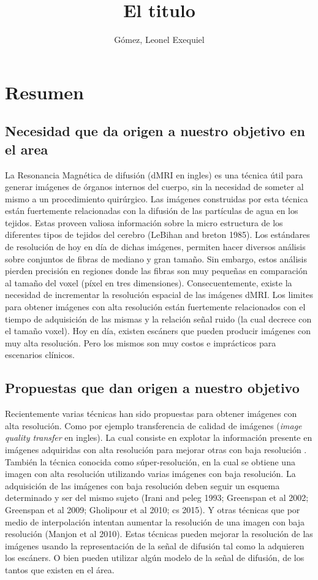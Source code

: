 \documentclass[a4paper,10pt]{article}
\title{El titulo}
\author{Gómez, Leonel Exequiel}
\begin{document}
\maketitle

\section{Resumen}

\subsection{Necesidad que da origen a nuestro objetivo en el area}
La Resonancia Magnética de difusión (dMRI en ingles) es una técnica útil para generar imágenes de 
órganos internos del 
cuerpo, sin la necesidad de someter al mismo a un procedimiento quirúrgico. Las imágenes construidas por esta técnica 
están fuertemente relacionadas con la difusión de las partículas de agua en los tejidos. Estas proveen valiosa 
información sobre la micro estructura de los diferentes tipos de tejidos del cerebro (LeBihan and 
breton 1985). Los estándares de resolución de hoy en día de dichas imágenes, permiten hacer 
diversos análisis sobre conjuntos de fibras de mediano y gran tamaño. Sin embargo, estos análisis 
pierden precisión en regiones donde las fibras son muy pequeñas en comparación 
al tamaño del voxel (píxel en tres dimensiones). Consecuentemente, existe la necesidad de 
incrementar la resolución espacial de las imágenes dMRI. Los limites para 
obtener imágenes con alta resolución están fuertemente relacionados con el 
tiempo de adquisición de las mismas y la relación señal ruido (la cual decrece 
con el tamaño voxel). Hoy en día, existen escáners que pueden 
producir imágenes con muy alta resolución. Pero los mismos son muy costos e 
imprácticos para escenarios clínicos.


\subsection{Propuestas que dan origen a nuestro objetivo}
Recientemente varias técnicas han sido propuestas para obtener imágenes con alta resolución. Como 
por ejemplo 
transferencia de calidad de imágenes (\textit{image quality transfer} en ingles). La cual 
consiste en explotar la 
información presente en imágenes adquiridas con alta resolución para mejorar otras con baja resolución 
\citep{Alexander2014}. También la técnica conocida como súper-resolución, en 
la cual se obtiene una imagen con alta resolución utilizando varias imágenes con baja resolución. 
La adquisición de las imágenes con baja 
resolución deben seguir un esquema determinado y ser del mismo sujeto (Irani and peleg 1993; Greenspan et al 
2002; Greenspan et al 2009; Gholipour et al 2010; cs 2015). Y otras técnicas que por medio de interpolación 
intentan aumentar la resolución de una imagen con baja resolución (Manjon et al 2010). Estas técnicas pueden mejorar la 
resolución de las imágenes usando la representación de la señal de difusión tal como la adquieren los escáners. O bien 
pueden utilizar algún modelo de la señal de difusión, de los tantos que existen en el área.
\end{document}
